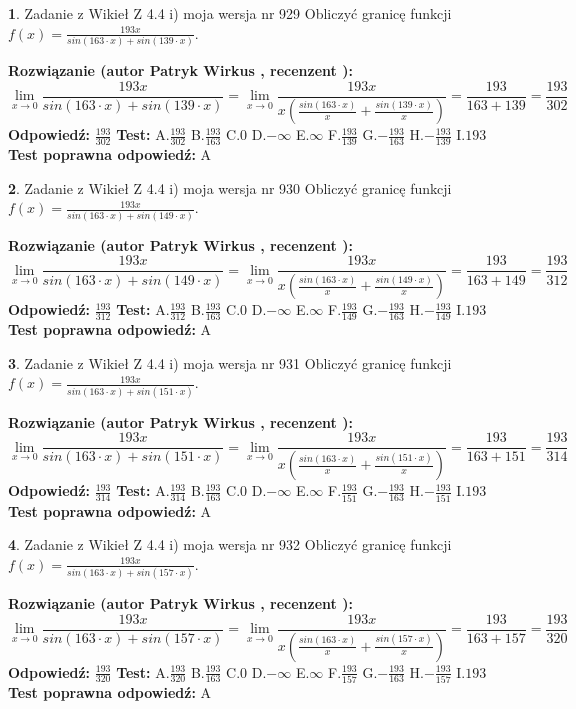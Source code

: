 \documentclass[12pt, a4paper]{article}
\theoremstyle{definition} %
\newtheorem{zad}{}
\newcommand{\zadStart}[1]{\begin{zad}#1\newline}
\newcommand{\zadStop}{\end{zad}}
\newcommand{\rozwStart}[2]{\noindent \textbf{Rozwiązanie (autor #1 , recenzent #2): }\newline}
\newcommand{\rozwStop}{\newline}
\newcommand{\odpStart}{\noindent \textbf{Odpowiedź:}\newline}
\newcommand{\odpStop}{\newline}
\newcommand{\testStart}{\noindent \textbf{Test:}\newline}
\newcommand{\testStop}{\newline}
\newcommand{\kluczStart}{\noindent \textbf{Test poprawna odpowiedź:}\newline}
\newcommand{\kluczStop}{\newline}
\begin{document}
\zadStart{Zadanie z Wikieł Z 4.4 i) moja wersja nr 929}
Obliczyć granicę funkcji $f(x)=\frac{193x}{sin(163\cdot x) +sin(139\cdot x)}$.
\zadStop
\rozwStart{Patryk Wirkus}{}
$$\lim\limits_{x\to 0}\frac{193x}{sin(163\cdot x) +sin(139\cdot x)}=\lim\limits_{x\to 0}\frac{193x}{x(\frac{sin(163\cdot x)}{x}+\frac{sin(139\cdot x)}{x})}=\frac{193}{163+139} = \frac{193}{302}$$
\rozwStop
\odpStart
$\frac{193}{302}$
\odpStop
\testStart
A.$\frac{193}{302}$
B.$\frac{193}{163}$
C.$0$
D.$-\infty$
E.$\infty$
F.$\frac{193}{139}$
G.$-\frac{193}{163}$
H.$-\frac{193}{139}$
I.$193$
\testStop
\kluczStart
A
\kluczStop



\zadStart{Zadanie z Wikieł Z 4.4 i) moja wersja nr 930}
Obliczyć granicę funkcji $f(x)=\frac{193x}{sin(163\cdot x) +sin(149\cdot x)}$.
\zadStop
\rozwStart{Patryk Wirkus}{}
$$\lim\limits_{x\to 0}\frac{193x}{sin(163\cdot x) +sin(149\cdot x)}=\lim\limits_{x\to 0}\frac{193x}{x(\frac{sin(163\cdot x)}{x}+\frac{sin(149\cdot x)}{x})}=\frac{193}{163+149} = \frac{193}{312}$$
\rozwStop
\odpStart
$\frac{193}{312}$
\odpStop
\testStart
A.$\frac{193}{312}$
B.$\frac{193}{163}$
C.$0$
D.$-\infty$
E.$\infty$
F.$\frac{193}{149}$
G.$-\frac{193}{163}$
H.$-\frac{193}{149}$
I.$193$
\testStop
\kluczStart
A
\kluczStop



\zadStart{Zadanie z Wikieł Z 4.4 i) moja wersja nr 931}
Obliczyć granicę funkcji $f(x)=\frac{193x}{sin(163\cdot x) +sin(151\cdot x)}$.
\zadStop
\rozwStart{Patryk Wirkus}{}
$$\lim\limits_{x\to 0}\frac{193x}{sin(163\cdot x) +sin(151\cdot x)}=\lim\limits_{x\to 0}\frac{193x}{x(\frac{sin(163\cdot x)}{x}+\frac{sin(151\cdot x)}{x})}=\frac{193}{163+151} = \frac{193}{314}$$
\rozwStop
\odpStart
$\frac{193}{314}$
\odpStop
\testStart
A.$\frac{193}{314}$
B.$\frac{193}{163}$
C.$0$
D.$-\infty$
E.$\infty$
F.$\frac{193}{151}$
G.$-\frac{193}{163}$
H.$-\frac{193}{151}$
I.$193$
\testStop
\kluczStart
A
\kluczStop



\zadStart{Zadanie z Wikieł Z 4.4 i) moja wersja nr 932}
Obliczyć granicę funkcji $f(x)=\frac{193x}{sin(163\cdot x) +sin(157\cdot x)}$.
\zadStop
\rozwStart{Patryk Wirkus}{}
$$\lim\limits_{x\to 0}\frac{193x}{sin(163\cdot x) +sin(157\cdot x)}=\lim\limits_{x\to 0}\frac{193x}{x(\frac{sin(163\cdot x)}{x}+\frac{sin(157\cdot x)}{x})}=\frac{193}{163+157} = \frac{193}{320}$$
\rozwStop
\odpStart
$\frac{193}{320}$
\odpStop
\testStart
A.$\frac{193}{320}$
B.$\frac{193}{163}$
C.$0$
D.$-\infty$
E.$\infty$
F.$\frac{193}{157}$
G.$-\frac{193}{163}$
H.$-\frac{193}{157}$
I.$193$
\testStop
\kluczStart
A
\kluczStop
\end{document}
